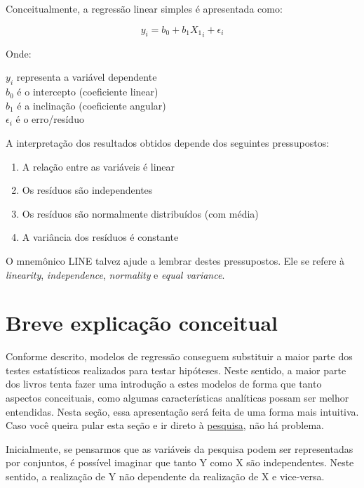 \documentclass[
]{book}
\providecommand{\tightlist}{%
  \setlength{\itemsep}{0pt}\setlength{\parskip}{0pt}}
\begin{document}
Conceitualmente, a regressão linear simples é apresentada como:

\[y_i = b_0 + b_1X{_1}_i + \epsilon_{i}\]

Onde:

\(y_i\) representa a variável dependente\\
\(b_0\) é o intercepto (coeficiente linear)\\
\(b_1\) é a inclinação (coeficiente angular)\\
\(\epsilon_{i}\) é o erro/resíduo

A interpretação dos resultados obtidos depende dos seguintes pressupostos:

\begin{enumerate}
\def\labelenumi{(\roman{enumi})}
\tightlist
\item
  A relação entre as variáveis é linear
\item
  Os resíduos são independentes\\
\item
  Os resíduos são normalmente distribuídos (com média)\\
\item
  A variância dos resíduos é constante
\end{enumerate}

O mnemônico LINE talvez ajude a lembrar destes pressupostos. Ele se refere à \emph{linearity}, \emph{independence}, \emph{normality} e \emph{equal variance}.

\hypertarget{breve-explicauxe7uxe3o-conceitual}{%
\section{Breve explicação conceitual}\label{breve-explicauxe7uxe3o-conceitual}}

Conforme descrito, modelos de regressão conseguem substituir a maior parte dos testes estatísticos realizados para testar hipóteses. Neste sentido, a maior parte dos livros tenta fazer uma introdução a estes modelos de forma que tanto aspectos conceituais, como algumas características analíticas possam ser melhor entendidas. Nesta seção, essa apresentação será feita de uma forma mais intuitiva. Caso você queira pular esta seção e ir direto à \protect\hyperlink{ux5cux23pesquisa}{pesquisa}, não há problema.

Inicialmente, se pensarmos que as variáveis da pesquisa podem ser representadas por conjuntos, é possível imaginar que tanto Y como X são independentes. Neste sentido, a realização de Y não dependente da realização de X e vice-versa.
\end{document}
